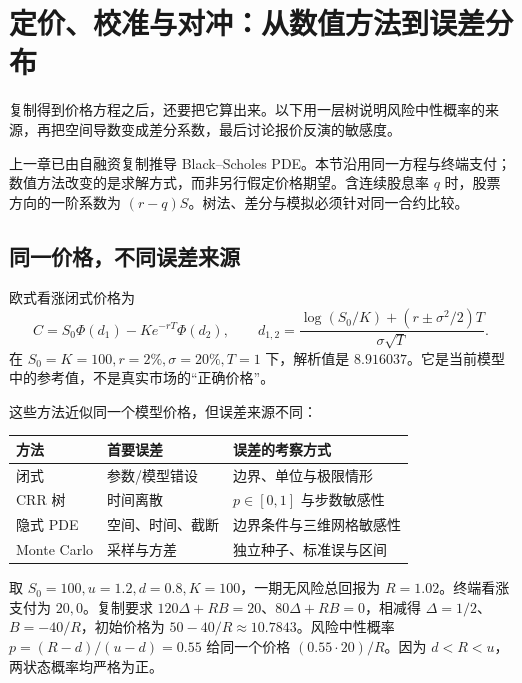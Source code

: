\chapter{定价、校准与对冲：从数值方法到误差分布}
\label{ch:lower-derivatives-numerics}

\begin{itemize}
  
\end{itemize}

复制得到价格方程之后，还要把它算出来。以下用一层树说明风险中性概率的来源，再把空间导数变成差分系数，最后讨论报价反演的敏感度。


上一章已由自融资复制推导 Black--Scholes PDE。本节沿用同一方程与终端支付；数值方法改变的是求解方式，而非另行假定价格期望。含连续股息率 $q$ 时，股票方向的一阶系数为 $(r-q)S$。树法、差分与模拟必须针对同一合约比较。

\section{同一价格，不同误差来源}

欧式看涨闭式价格为
\[
 C=S_0\Phi(d_1)-Ke^{-rT}\Phi(d_2),\qquad
 d_{1,2}=\frac{\log(S_0/K)+(r\pm\sigma^2/2)T}{\sigma\sqrt T}.
\]
在 $S_0=K=100,r=2\%,\sigma=20\%,T=1$ 下，解析值是 $8.916037$。它是当前模型中的参考值，不是真实市场的“正确价格”。



这些方法近似同一个模型价格，但误差来源不同：
\begin{center}
\begin{tabular}{lll}
\toprule
方法 & 首要误差 & 误差的考察方式\\
\midrule
闭式 & 参数/模型错设 & 边界、单位与极限情形\\
CRR 树 & 时间离散 & $p\in[0,1]$ 与步数敏感性\\
隐式 PDE & 空间、时间、截断 & 边界条件与三维网格敏感性\\
Monte Carlo & 采样与方差 & 独立种子、标准误与区间\\
\bottomrule
\end{tabular}
\end{center}


取 $S_0=100,u=1.2,d=0.8,K=100$，一期无风险总回报为 $R=1.02$。终端看涨支付为 $20,0$。复制要求 $120\Delta+RB=20$、$80\Delta+RB=0$，相减得 $\Delta=1/2$、$B=-40/R$，初始价格为 $50-40/R\approx10.7843$。风险中性概率 $p=(R-d)/(u-d)=0.55$ 给同一个价格 $(0.55\cdot20)/R$。因为 $d<R<u$，两状态概率均严格为正。

